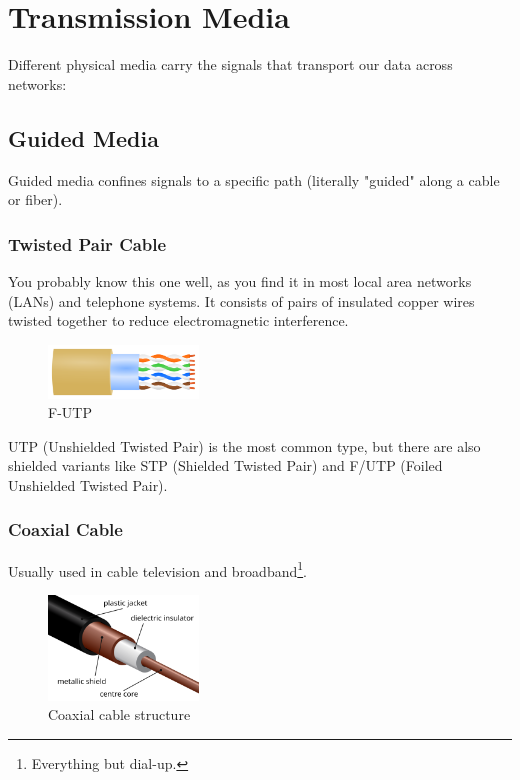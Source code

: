 \section{Transmission Media}\label{sec:transmission_media}
Different physical media carry the signals that transport our data across networks:

\subsection*{Guided Media}
Guided media confines signals to a specific path (literally "guided" along a cable or fiber). 

\subsubsection*{Twisted Pair Cable}
You probably know this one well, as you find it in most local area networks (LANs) and telephone systems. It consists of pairs of insulated copper wires twisted together to reduce electromagnetic interference.

\begin{figure}[h]
    \centering
    \includegraphics[width=4cm]{assets/osi/physical/f-utp.png}
    \caption{F-UTP}\label{fig:twisted_pair}
\end{figure}

UTP (Unshielded Twisted Pair) is the most common type, but there are also shielded variants like STP (Shielded Twisted Pair) and F/UTP (Foiled Unshielded Twisted Pair).

\vspace{1em}

\subsubsection*{Coaxial Cable}
Usually used in cable television and broadband\footnote{Everything but dial-up.}.

\begin{figure}[h]
    \centering
    \includegraphics[width=4cm]{assets/osi/physical/coax.png}
    \caption{Coaxial cable structure}\label{fig:coaxial_cable}
\end{figure}

